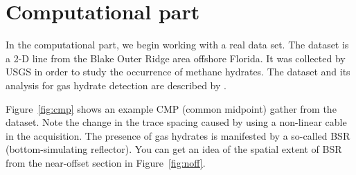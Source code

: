 \lstset{language=python,numbers=left,numberstyle=\tiny,showstringspaces=false}

\section{Computational part}

In the computational part, we begin working with a real data
set. The dataset is a 2-D line from the Blake Outer Ridge area
offshore Florida. It was collected by USGS in order to study the
occurrence of methane hydrates. The dataset and its analysis for gas
hydrate detection are described by
\cite{GEO63-05-16591669,GEO65-02-05650573}.

Figure~\ref{fig:cmp} shows an example CMP (common midpoint) gather
from the dataset. Note the change in the trace spacing caused by using
a non-linear cable in the acquisition. The presence of gas hydrates is
manifested by a so-called BSR (bottom-simulating reflector). You can
get an idea of the spatial extent of BSR from the near-offset section
in Figure~\ref{fig:noff}.



